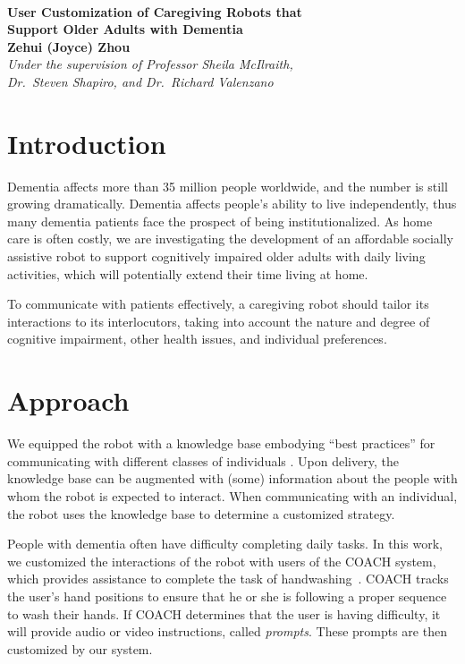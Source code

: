 \documentclass[11pt,a4paper, final, twoside]{article}
\theoremstyle{proposition}
\theoremstyle{definition}
\theoremstyle{remark}
\numberwithin{equation}{section}
\begin{document}


\sloppypar

\begin{center}

{\Large \textbf{\\User Customization of Caregiving Robots that \\Support Older Adults with Dementia}}\\[5mm]
{\large \textbf{Zehui (Joyce) Zhou}\\[1mm]}
{\normalsize \emph{Under the supervision of Professor Sheila McIlraith,\\ Dr.\ Steven Shapiro, and Dr.\ Richard Valenzano}\\[1mm]}
\end{center}


\section{Introduction}\label{I1}
Dementia affects more than 35 million people worldwide, and the number is still growing dramatically. Dementia affects people's ability to live independently, thus many dementia patients face the prospect of being institutionalized. As home care is often costly, we are investigating the development of an affordable socially assistive robot to support cognitively impaired older adults with daily living activities, which will potentially extend their time living at home.

To communicate with patients effectively, a caregiving robot should tailor its interactions to its interlocutors, taking into account the nature and degree of cognitive impairment, other health issues, and individual preferences.
\section{Approach}\label{I2}
We equipped the robot with a knowledge base embodying ``best practices'' for communicating with different classes of individuals \cite{practice1,practice2, rochon, web1, web2, web3}. Upon delivery, the knowledge base can be augmented with (some) information about the people with whom the robot is expected to interact. When communicating with an individual, the robot uses the knowledge base to determine a customized strategy.

People with dementia often have difficulty completing daily tasks.
In this work, we customized the interactions of the robot with users of the COACH system, which provides assistance to complete the task of handwashing~\cite{COACH}.
COACH tracks the user's hand positions to ensure that he or she is following a proper sequence to wash their hands.  
If COACH determines that the user is having difficulty, it will provide audio or video instructions, called \emph{prompts}. These prompts are then customized by our system.
\end{document}
